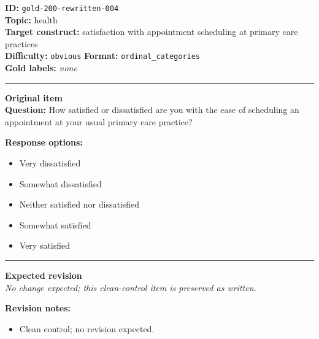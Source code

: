 \documentclass[10pt,a4paper]{article}
\newcommand{\sectionline}{\vspace{0.15em}\hrule\vspace{0.35em}}
\begin{document}
\begin{tcolorbox}[colframe=CleanGreen,colback=white,colbacktitle=CleanGreen!9,coltitle=black,title={Item 004\hfill Clean control}]
\textbf{ID:} \texttt{gold-200-rewritten-004}\\
\textbf{Topic:} health\\
\textbf{Target construct:} satisfaction with appointment scheduling at primary care practices\\
\textbf{Difficulty:} \texttt{obvious} \quad \textbf{Format:} \texttt{ordinal\_categories}\\
\textbf{Gold labels:} \textit{none}\\
\sectionline
\textbf{Original item}\\
\textbf{Question:} How satisfied or dissatisfied are you with the ease of scheduling an appointment at your usual primary care practice?
\par\textbf{Response options:}
\begin{itemize}
\item Very dissatisfied
\item Somewhat dissatisfied
\item Neither satisfied nor dissatisfied
\item Somewhat satisfied
\item Very satisfied
\end{itemize}
\sectionline
\textbf{Expected revision}\\
\textit{No change expected; this clean-control item is preserved as written.}
\par\textbf{Revision notes:}
\begin{itemize}
\item Clean control; no revision expected.
\end{itemize}
\end{tcolorbox}
\end{document}
